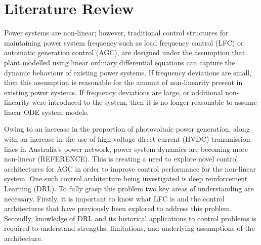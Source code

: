 \chapter{Literature Review}
Power systems are non-linear; however, traditional control structures for maintaining power system frequency such as load frequency control (LFC) or automatic generation control (AGC), are designed under the assumption that plant modelled using linear ordinary differential equations can capture the dynamic behaviour of existing power systems. If frequency deviations are small, then this assumption is reasonable for the amount of non-linearity present in existing power systems. If frequency deviations are large, or additional non-linearity were introduced to the system, then it is no longer reasonable to assume linear ODE system models.

Owing to an increase in the proportion of photovoltaic power generation, along with an increase in the use of high voltage direct current (HVDC) transmission lines in Australia's power network, power system dynamics are becoming more non-linear (REFERENCE). This is creating a need to explore novel control architectures for AGC in order to improve control performance for the non-linear system. One such control architecture being investigated is deep reinforcement Learning (DRL). To fully grasp this problem two key areas of understanding are necessary. Firstly, it is important to know what LFC is and the control architectures that have previously been explored to address this problem. Secondly, knowledge of DRL and its historical applications to control problems is required to understand strengths, limitations, and underlying assumptions of the architecture.


